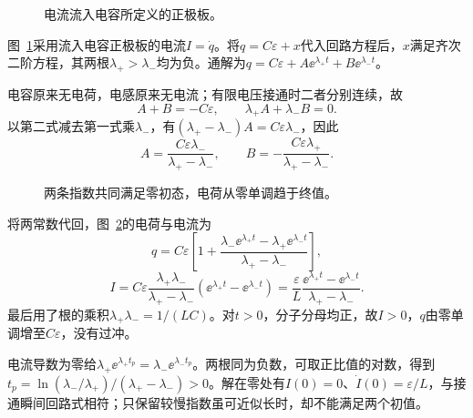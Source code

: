 \begin{figure}[H]\centering
{}
\caption{电流流入电容所定义的正极板。}\label{fig:c4-rlc-over-q}
\end{figure}
\begin{solution}
图~\ref{fig:c4-rlc-over-q}采用流入电容正极板的电流$I=\dot q$。将$q=C\varepsilon+x$代入回路方程后，$x$满足齐次二阶方程，其两根$\lambda_+>\lambda_-$均为负。通解为$q=C\varepsilon+A\ee^{\lambda_+t}+B\ee^{\lambda_-t}$。

电容原来无电荷，电感原来无电流；有限电压接通时二者分别连续，故
\[
 A+B=-C\varepsilon,\qquad \lambda_+A+\lambda_-B=0.
\]
以第二式减去第一式乘$\lambda_-$，有$(\lambda_+-\lambda_-)A=C\varepsilon\lambda_-$，因此
\[
 A=\frac{C\varepsilon\lambda_-}{\lambda_+-\lambda_-},\qquad
 B=-\frac{C\varepsilon\lambda_+}{\lambda_+-\lambda_-}.
\]
\begin{figure}[H]\centering
{}
\caption{两条指数共同满足零初态，电荷从零单调趋于终值。}\label{fig:c4-rlc-over-s}
\end{figure}
将两常数代回，图~\ref{fig:c4-rlc-over-s}的电荷与电流为
\[
 \boxed{q=C\varepsilon\left[1+
 \frac{\lambda_-\ee^{\lambda_+t}-\lambda_+\ee^{\lambda_-t}}
 {\lambda_+-\lambda_-}\right]},
\]
\[
 I=C\varepsilon\frac{\lambda_+\lambda_-}{\lambda_+-\lambda_-}
 (\ee^{\lambda_+t}-\ee^{\lambda_-t})
 =\boxed{\frac\varepsilon L\frac{\ee^{\lambda_+t}-\ee^{\lambda_-t}}
 {\lambda_+-\lambda_-}}.
\]
最后用了根的乘积$\lambda_+\lambda_-=1/(LC)$。对$t>0$，分子分母均正，故$I>0$，$q$由零单调增至$C\varepsilon$，没有过冲。

电流导数为零给$\lambda_+\ee^{\lambda_+t_p}=\lambda_-\ee^{\lambda_-t_p}$。两根同为负数，可取正比值的对数，得到$t_p=\ln(\lambda_-/\lambda_+)/(\lambda_+-\lambda_-)>0$。解在零处有$I(0)=0$、$\dot I(0)=\varepsilon/L$，与接通瞬间回路式相符；只保留较慢指数虽可近似长时，却不能满足两个初值。
\end{solution}

